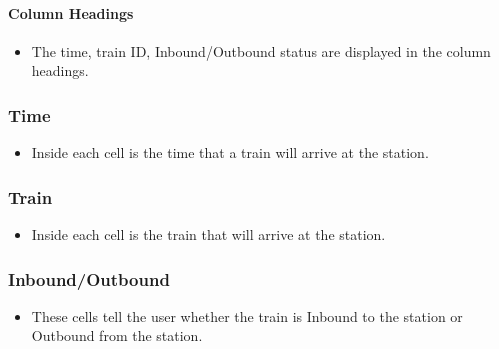 \documentclass[letterpaper]{article}
\begin{document}
\paragraph{Column Headings}
\begin{itemize}
	\item The time, train ID, Inbound/Outbound status are displayed in the column headings.
\end{itemize}

\subsubsection{Time}
\begin{itemize}
	\item Inside each cell is the time that a train will arrive at the station.
\end{itemize}

\subsubsection{Train}
\begin{itemize}
	\item Inside each cell is the train that will arrive at the station.
\end{itemize}

\subsubsection{Inbound/Outbound}
\begin{itemize}
	\item These cells tell the user whether the train is Inbound to the station or Outbound from the station.
\end{itemize}
\end{document}
